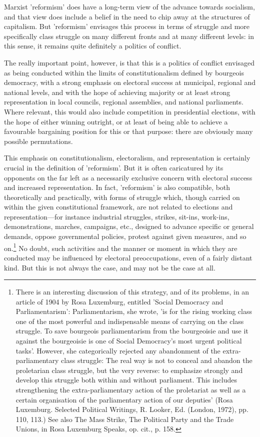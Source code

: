 Marxist 'reformism' does have a long-term view of the advance towards socialism, and that view does include a belief in the need to chip away at the structures of capitalism. But 'reformism' envisages this process in terms of struggle and more specifically class struggle on many different fronts and at many different levels: in this sense, it remains quite definitely a politics of conflict.

The really important point, however, is that this is a politics of conflict envisaged as being conducted within the limits of constitutionalism defined by bourgeois democracy, with a strong emphasis on electoral success at municipal, regional and national levels, and with the hope of achieving majority or at least strong representation in local councils, regional assemblies, and national parliaments. Where relevant, this would also include competition in presidential elections, with the hope of either winning outright, or at least of being able to achieve a favourable bargaining position for this or that purpose: there are obviously many possible permutations.

This emphasis on constitutionalism, electoralism, and representation is certainly crucial in the definition of 'reformism'. But it is often caricatured by its opponents on the far left as a necessarily exclusive concern with electoral success and increased representation. In fact, 'reformism' is also compatible, both theoretically and practically, with forms of struggle which, though carried on within the given constitutional framework, are not related to elections and representation—for instance industrial struggles, strikes, sit-ins, work-ins, demonstrations, marches, campaigns, etc., designed to advance specific or general demands, oppose governmental policies, protest against given measures, and so on.\footnote{There is an interesting discussion of this strategy, and of its problems, in an article of 1904 by Rosa Luxemburg, entitled 'Social Democracy and Parliamentarism': Parliamentarism, she wrote, 'is for the rising working class one of the most powerful and indispensable means of carrying on the class struggle. To save bourgeois parliamentarism from the bourgeoisie and use it against the bourgeoisie is one of Social Democracy's most urgent political tasks'. However, she categorically rejected any abandonment of the extra-parliamentary class struggle: The real way is not to conceal and abandon the proletarian class struggle, but the very reverse: to emphasize strongly and develop this struggle both within and without parliament. This includes strengthening the extra-parliamentary action of the proletariat as well as a certain organisation of the parliamentary action of our deputies' (Rosa Luxemburg. Selected Political Writings, R. Looker, Ed. (London, 1972), pp. 110, 113.) See also The Mass Strike, The Political Party and the Trade Unions, in Rosa Luxemburg Speaks, op. cit., p. 158.} No doubt, such activities and the manner or moment in which they are conducted may be influenced by electoral preoccupations, even of a fairly distant kind. But this is not always the case, and may not be the case at all.

